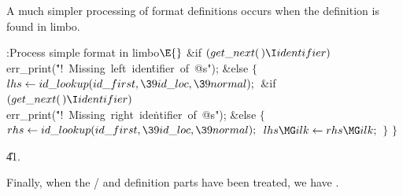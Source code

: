 A much simpler processing of format definitions occurs when the
definition is found in limbo.

\Y\B\4:Process simple format in limbo\X${}\E{}$\6
\&{if} ${}(\\{get\_next}(\,)\I\\{identifier}){}$\1\5
\\{err\_print}(\.{"!\ Missing\ left\ iden}\)\.{tifier\ of\ @s"});\2\6
\&{else}\5
${}\{{}$\1\6
${}\\{lhs}\K\\{id\_lookup}(\\{id\_first},\39\\{id\_loc},\39\\{normal});{}$\6
\&{if} ${}(\\{get\_next}(\,)\I\\{identifier}){}$\1\5
\\{err\_print}(\.{"!\ Missing\ right\ ide}\)\.{ntifier\ of\ @s"});\2\6
\&{else}\5
${}\{{}$\1\6
${}\\{rhs}\K\\{id\_lookup}(\\{id\_first},\39\\{id\_loc},\39\\{normal});{}$\6
${}\\{lhs}\MG\\{ilk}\K\\{rhs}\MG\\{ilk};{}$\6
\4${}\}{}$\2\6
\4${}\}{}$\2\par
\U41.\fi

Finally, when the \TEX/ and definition parts have been treated, we have
.

